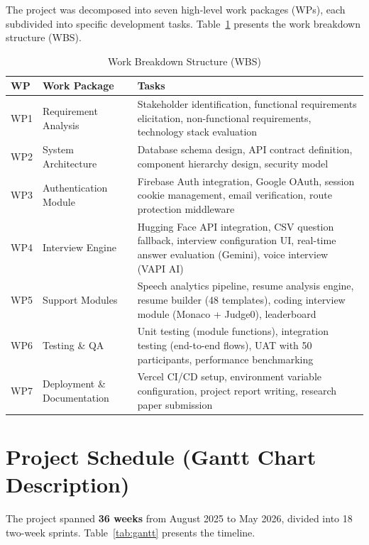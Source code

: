 \documentclass[12pt,a4paper,oneside]{report}
\begin{document}
The project was decomposed into seven high-level work packages (WPs), each subdivided into specific development tasks. Table~\ref{tab:task_decomp} presents the work breakdown structure (WBS).

\begin{table}[H]
\centering
\caption{Work Breakdown Structure (WBS)}
\label{tab:task_decomp}
\begin{tabular}{|p{1cm}|p{3.5cm}|p{8.5cm}|}
\hline
\textbf{WP} & \textbf{Work Package} & \textbf{Tasks} \\
\hline
WP1 & Requirement Analysis & Stakeholder identification, functional requirements elicitation, non-functional requirements, technology stack evaluation \\
\hline
WP2 & System Architecture & Database schema design, API contract definition, component hierarchy design, security model \\
\hline
WP3 & Authentication Module & Firebase Auth integration, Google OAuth, session cookie management, email verification, route protection middleware \\
\hline
WP4 & Interview Engine & Hugging Face API integration, CSV question fallback, interview configuration UI, real-time answer evaluation (Gemini), voice interview (VAPI AI) \\
\hline
WP5 & Support Modules & Speech analytics pipeline, resume analysis engine, resume builder (48 templates), coding interview module (Monaco + Judge0), leaderboard \\
\hline
WP6 & Testing \& QA & Unit testing (module functions), integration testing (end-to-end flows), UAT with 50 participants, performance benchmarking \\
\hline
WP7 & Deployment \& Documentation & Vercel CI/CD setup, environment variable configuration, project report writing, research paper submission \\
\hline
\end{tabular}
\end{table}


\section{Project Schedule (Gantt Chart Description)}
\label{sec:gantt}

The project spanned \textbf{36 weeks} from August 2025 to May 2026, divided into 18 two-week sprints. Table~\ref{tab:gantt} presents the timeline.
\end{document}
